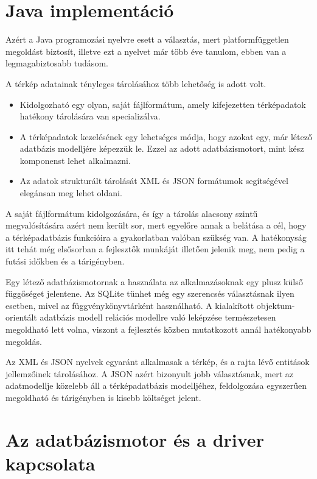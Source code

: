 
\section{Java implementáció}

Azért a Java programozási nyelvre esett a választás, mert platformfüggetlen megoldást biztosít, illetve ezt a nyelvet már több éve tanulom, ebben van a legmagabiztosabb tudásom.

A térkép adatainak tényleges tárolásához több lehetőség is adott volt.
\begin{itemize}
\item Kidolgozható egy olyan, saját fájlformátum, amely kifejezetten térképadatok hatékony tárolására van specializálva.
\item A térképadatok kezelésének egy lehetséges módja, hogy azokat egy, már létező adatbázis modelljére képezzük le. Ezzel az adott adatbázismotort, mint kész komponenst lehet alkalmazni.
\item Az adatok strukturált tárolását XML és JSON formátumok segítségével elegánsan meg lehet oldani.
\end{itemize}

A saját fájlformátum kidolgozására, és így a tárolás alacsony szintű megvalósítására azért nem került sor, mert egyelőre annak a belátása a cél, hogy a térképadatbázis funkcióira a gyakorlatban valóban szükség van. A hatékonyság itt tehát még elsősorban a fejlesztők munkáját illetően jelenik meg, nem pedig a futási időkben és a tárigényben.

Egy létező adatbázismotornak a használata az alkalmazásoknak egy plusz külső függőséget jelentene. Az SQLite tünhet még egy szerencsés választásnak ilyen esetben, mivel az függvénykönyvtárként használható. A kialakított objektum-orientált adatbázis modell relációs modellre való leképzése természetesen megoldható lett volna, viszont a fejlesztés közben mutatkozott annál hatékonyabb megoldás.

Az XML és JSON nyelvek egyaránt alkalmasak a térkép, és a rajta lévő entitások jellemzőinek tárolásához. A JSON azért bizonyult jobb választásnak, mert az adatmodellje közelebb áll a térképadatbázis modelljéhez, feldolgozása egyszerűen megoldható és tárigényben is kisebb költséget jelent.

\section{Az adatbázismotor és a driver kapcsolata}

